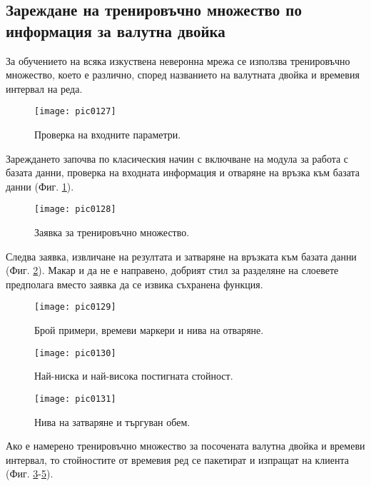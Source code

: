 \subsection{Зареждане на тренировъчно множество по информация за валутна двойка}

За обучението на всяка изкуствена неверонна мрежа се използва тренировъчно множество, което е различно, според названието на валутната двойка и времевия интервал на реда. 

\begin{figure}[h]
  \centering
  \texttt{[image: pic0127]}
  \caption{Проверка на входните параметри.}
\label{fig:pic0127}
\end{figure}
\FloatBarrier

Зареждането започва по класическия начин с включване на модула за работа с базата данни, проверка на входната информация и отваряне на връзка към базата данни (Фиг. \ref{fig:pic0127}).

\begin{figure}[h]
  \centering
  \texttt{[image: pic0128]}
  \caption{Заявка за тренировъчно множество.}
\label{fig:pic0128}
\end{figure}
\FloatBarrier

Следва заявка, извличане на резултата и затваряне на връзката към базата данни (Фиг. \ref{fig:pic0128}). Макар и да не е направено, добрият стил за разделяне на слоевете предполага вместо заявка да се извика съхранена функция. 

\begin{figure}[h]
  \centering
  \texttt{[image: pic0129]}
  \caption{Брой примери, времеви маркери и нива на отваряне.}
\label{fig:pic0129}
\end{figure}
\FloatBarrier

\begin{figure}[h]
  \centering
  \texttt{[image: pic0130]}
  \caption{Най-ниска и най-висока постигната стойност.}
\label{fig:pic0130}
\end{figure}
\FloatBarrier

\begin{figure}[h]
  \centering
  \texttt{[image: pic0131]}
  \caption{Нива на затваряне и търгуван обем.}
\label{fig:pic0131}
\end{figure}
\FloatBarrier

Ако е намерено тренировъчно множество за посочената валутна двойка и времеви интервал, то стойностите от времевия ред се пакетират и изпращат на клиента (Фиг. \ref{fig:pic0129}-\ref{fig:pic0131}).

